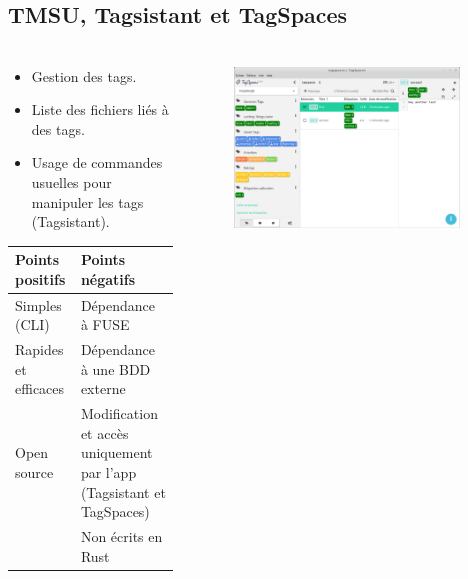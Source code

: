 \documentclass[10pt]{beamer}
\begin{document}
\subsection{TMSU, Tagsistant et TagSpaces}
\begin{frame}
    \frametitle{\subsecname}
    \begin{columns}[T]
        \begin{column}{.4\textwidth}
        \fontsize{7pt}{9}\selectfont
            \begin{center}
                \begin{itemize}
                    \item Gestion des tags.
                    \item Liste des fichiers liés à des tags.
                    \item Usage de commandes usuelles pour manipuler les tags (Tagsistant).
                \end{itemize}
                \pause[3]
                \bigbreak
                \begin{tabularx}{5cm}{|p{1.8cm}|X|} \hline
                    \textbf{Points positifs} & \textbf{Points négatifs} \\ \hline
                    Simples (CLI) & Dépendance à FUSE \\ \hline
                    Rapides et efficaces & Dépendance à une BDD externe \\ \hline
                    Open source & Modification et accès uniquement par l'app (Tagsistant et TagSpaces) \\ \hline
                    & Non écrits en Rust \\ \hline
                \end{tabularx}
            \end{center}
        \end{column}
        \pause[2]
        \begin{column}{.6\textwidth}
            \begin{flushright}
                \begin{figure}
                    \includegraphics[width=0.95\textwidth]{images/tagspaces.png}

\end{figure}
\end{flushright}
\end{column}
\end{columns}
\end{frame}
\end{document}
